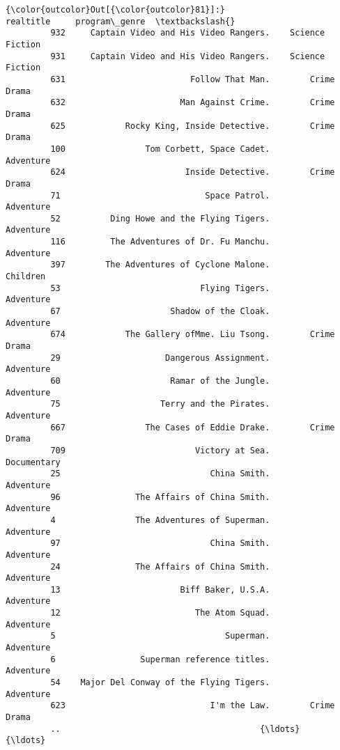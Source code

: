 \documentclass[11pt]{article}
\begin{document}
\begin{Verbatim}[commandchars=\\\{\}]
{\color{outcolor}Out[{\color{outcolor}81}]:}                                     realtitle     program\_genre  \textbackslash{}
         932     Captain Video and His Video Rangers.    Science Fiction   
         931     Captain Video and His Video Rangers.    Science Fiction   
         631                         Follow That Man.        Crime Drama   
         632                       Man Against Crime.        Crime Drama   
         625            Rocky King, Inside Detective.        Crime Drama   
         100                Tom Corbett, Space Cadet.          Adventure   
         624                        Inside Detective.        Crime Drama   
         71                             Space Patrol.          Adventure   
         52          Ding Howe and the Flying Tigers.          Adventure   
         116         The Adventures of Dr. Fu Manchu.          Adventure   
         397        The Adventures of Cyclone Malone.           Children   
         53                            Flying Tigers.          Adventure   
         67                      Shadow of the Cloak.          Adventure   
         674            The Gallery ofMme. Liu Tsong.        Crime Drama   
         29                     Dangerous Assignment.          Adventure   
         60                      Ramar of the Jungle.          Adventure   
         75                    Terry and the Pirates.          Adventure   
         667                The Cases of Eddie Drake.        Crime Drama   
         709                          Victory at Sea.        Documentary   
         25                              China Smith.          Adventure   
         96               The Affairs of China Smith.          Adventure   
         4                The Adventures of Superman.          Adventure   
         97                              China Smith.          Adventure   
         24               The Affairs of China Smith.          Adventure   
         13                        Biff Baker, U.S.A.          Adventure   
         12                           The Atom Squad.          Adventure   
         5                                  Superman.          Adventure   
         6                 Superman reference titles.          Adventure   
         54    Major Del Conway of the Flying Tigers.          Adventure   
         623                             I'm the Law.        Crime Drama   
         ..                                        {\ldots}               {\ldots}   

\end{Verbatim}
\end{document}
